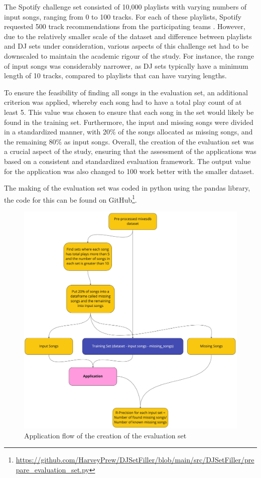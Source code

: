 The Spotify challenge set consisted of 10,000 playlists with varying numbers of input songs, ranging from 0 to 100 tracks. For each of these playlists, Spotify requested 500 track recommendations from the participating teams \citep{aicrowd_aicrowd_2023}. However, due to the relatively smaller scale of the dataset and difference between playlists and DJ sets under consideration, various aspects of this challenge set had to be downscaled to maintain the academic rigour of the study. For instance, the range of input songs was considerably narrower, as DJ sets typically have a minimum length of 10 tracks, compared to playlists that can have varying lengths.

To ensure the feasibility of finding all songs in the evaluation set, an additional criterion was applied, whereby each song had to have a total play count of at least 5. This value was chosen to ensure that each song in the set would likely be found in the training set. Furthermore, the input and missing songs were divided in a standardized manner, with 20\% of the songs allocated as missing songs, and the remaining 80\% as input songs. Overall, the creation of the evaluation set was a crucial aspect of the study, ensuring that the assessment of the applications was based on a consistent and standardized evaluation framework. The output value for the application was also changed to 100 work better with the smaller dataset.

The making of the evaluation set was coded in python using the pandas library, the code for this can be found on GitHub\footnote{\url{https://github.com/HarveyPrew/DJSetFiller/blob/main/src/DJSetFiller/prepare_evaluation_set.py}}.
\\
\begin{figure}[H]
	\includegraphics[scale=0.1]{images/evaluation_set_app_flow}
	\centering
	\caption{Application flow of the creation of the evaluation set} 
\end{figure}

